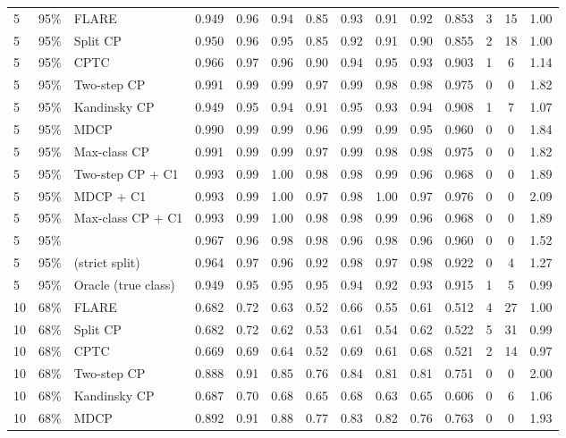\begin{longtable}{lllccccccccccc}
\midrule
5 & 95\% & FLARE & 0.949 & 0.96 & 0.94 & 0.85 & 0.93 & 0.91 & 0.92 & 0.853 & 3 & 15 & 1.00 \\
5 & 95\% & Split CP & 0.950 & 0.96 & 0.95 & 0.85 & 0.92 & 0.91 & 0.90 & 0.855 & 2 & 18 & 1.00 \\
5 & 95\% & CPTC & 0.966 & 0.97 & 0.96 & 0.90 & 0.94 & 0.95 & 0.93 & 0.903 & 1 & 6 & 1.14 \\
5 & 95\% & Two-step CP & 0.991 & 0.99 & 0.99 & 0.97 & 0.99 & 0.98 & 0.98 & 0.975 & 0 & 0 & 1.82 \\
5 & 95\% & Kandinsky CP & 0.949 & 0.95 & 0.94 & 0.91 & 0.95 & 0.93 & 0.94 & 0.908 & 1 & 7 & 1.07 \\
5 & 95\% & MDCP & 0.990 & 0.99 & 0.99 & 0.96 & 0.99 & 0.99 & 0.95 & 0.960 & 0 & 0 & 1.84 \\
5 & 95\% & Max-class CP & 0.991 & 0.99 & 0.99 & 0.97 & 0.99 & 0.98 & 0.98 & 0.975 & 0 & 0 & 1.82 \\
5 & 95\% & Two-step CP + C1 & 0.993 & 0.99 & 1.00 & 0.98 & 0.98 & 0.99 & 0.96 & 0.968 & 0 & 0 & 1.89 \\
5 & 95\% & MDCP + C1 & 0.993 & 0.99 & 1.00 & 0.97 & 0.98 & 1.00 & 0.97 & 0.976 & 0 & 0 & 2.09 \\
5 & 95\% & Max-class CP + C1 & 0.993 & 0.99 & 1.00 & 0.98 & 0.98 & 0.99 & 0.96 & 0.968 & 0 & 0 & 1.89 \\
5 & 95\% & \gamut{} & 0.967 & 0.96 & 0.98 & 0.98 & 0.96 & 0.98 & 0.96 & 0.960 & 0 & 0 & 1.52 \\
5 & 95\% & \gamut{} (strict split) & 0.964 & 0.97 & 0.96 & 0.92 & 0.98 & 0.97 & 0.98 & 0.922 & 0 & 4 & 1.27 \\
5 & 95\% & Oracle (true class) & 0.949 & 0.95 & 0.95 & 0.95 & 0.94 & 0.92 & 0.93 & 0.915 & 1 & 5 & 0.99 \\
\midrule
10 & 68\% & FLARE & 0.682 & 0.72 & 0.63 & 0.52 & 0.66 & 0.55 & 0.61 & 0.512 & 4 & 27 & 1.00 \\
10 & 68\% & Split CP & 0.682 & 0.72 & 0.62 & 0.53 & 0.61 & 0.54 & 0.62 & 0.522 & 5 & 31 & 0.99 \\
10 & 68\% & CPTC & 0.669 & 0.69 & 0.64 & 0.52 & 0.69 & 0.61 & 0.68 & 0.521 & 2 & 14 & 0.97 \\
10 & 68\% & Two-step CP & 0.888 & 0.91 & 0.85 & 0.76 & 0.84 & 0.81 & 0.81 & 0.751 & 0 & 0 & 2.00 \\
10 & 68\% & Kandinsky CP & 0.687 & 0.70 & 0.68 & 0.65 & 0.68 & 0.63 & 0.65 & 0.606 & 0 & 6 & 1.06 \\
10 & 68\% & MDCP & 0.892 & 0.91 & 0.88 & 0.77 & 0.83 & 0.82 & 0.76 & 0.763 & 0 & 0 & 1.93 \\

\end{longtable}
